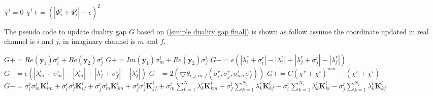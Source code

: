 \documentclass[12pt, draftclsnofoot, onecolumn]{IEEEtran}
\begin{document}
\begin{spacing}{2}
\begin{algorithm}[htb]
\begin{algorithmic}
\State $\chi^{i}=0$  
\State $\chi^{i}+=(|\Phi^{i}_{i}+\Psi^{i}_{i}|-\epsilon)^{2}$
\EndIf
\EndFor
\EndProcedure
\end{algorithmic}
\end{algorithm}
The pseudo code to update duality gap $G$ based on (\ref{simple duality gap final}) is shown as follow assume the coordinate updated in real channel is $i$ and $j$, in imaginary channel is $m$ and $f$.
\begin{algorithm}[htb]
\begin{algorithmic}
\State $G+=Re(\mathbf{y}_{1})\sigma^{r}_{i}+Re(\mathbf{y}_{2})\sigma^{r}_{j}$
\State $G+=Im(\mathbf{y}_{1})\sigma^{i}_{m}+Re(\mathbf{y}_{2})\sigma^{i}_{f}$
\State $G-=\epsilon(|\lambda^{r}_{i}+\sigma^{r}_{i}|-|\lambda^{r}_{i}|+|\lambda^{r}_{j}+\sigma^{r}_{j}|-|\lambda^{r}_{j}|)$
\State $G-=\epsilon(|\lambda^{i}_{m}+\sigma^{i}_{m}|-|\lambda^{i}_{m}|+|\lambda^{i}_{f}+\sigma^{i}_{f}|-|\lambda^{i}_{f}|)$
\State $G-=2(\bigtriangledown \theta_{i,j,m,f}(\sigma^{r}_{i},\sigma^{r}_{j},\sigma^{i}_{m},\sigma^{i}_{f}))$
\State $G+=C(\chi^{r}+\chi^{i})^{new}-(\chi^{r}+\chi^{i})$ 
\State $G-=\sigma^{r}_{i}\sigma^{i}_{m}\mathbf{K}^{i}_{im}+\sigma^{r}_{i}\sigma^{i}_{f}\mathbf{K}^{i}_{if}+\sigma^{r}_{j}\sigma^{i}_{m}\mathbf{K}^{i}_{jm}+\sigma^{r}_{j}\sigma^{i}_{f}\mathbf{K}^{i}_{jf}+\sigma^{i}_{m}\sum_{k=1}^{N_{r}}\lambda_{k}^{r}\mathbf{K}^{i}_{km}+\sigma^{i}_{f}\sum_{k=1}^{N_{r}}\lambda_{k}^{r}\mathbf{K}^{i}_{kf}-\sigma^{r}_{i}\sum_{k=1}^{N_{r}}\lambda_{k}^{i}\mathbf{K}^{i}_{ki}-\sigma^{r}_{j}\sum_{k=1}^{N_{r}}\lambda_{k}^{i}\mathbf{K}^{i}_{kj}$ 
\EndProcedure
\label{update G Phi and Psi}
\end{algorithmic}
\end{algorithm}



\end{spacing}
\end{document}
